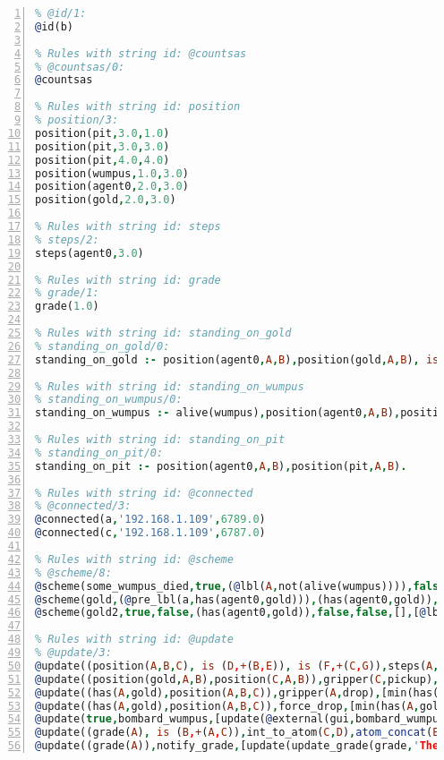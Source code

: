 \documentclass[11pt]{article}\usepackage[utf8]{inputenc}\usepackage{geometry}
\begin{document}
\lstset{breaklines=true}\begin{lstlisting}[language=Prolog, numbers=left]
% Rules with string id: @id
% @id/1:
@id(b)

% Rules with string id: @countsas
% @countsas/0:
@countsas

% Rules with string id: position
% position/3:
position(pit,3.0,1.0)
position(pit,3.0,3.0)
position(pit,4.0,4.0)
position(wumpus,1.0,3.0)
position(agent0,2.0,3.0)
position(gold,2.0,3.0)

% Rules with string id: steps
% steps/2:
steps(agent0,3.0)

% Rules with string id: grade
% grade/1:
grade(1.0)

% Rules with string id: standing_on_gold
% standing_on_gold/0:
standing_on_gold :- position(agent0,A,B),position(gold,A,B), is (C,+(A,B)),>(C,2.0).

% Rules with string id: standing_on_wumpus
% standing_on_wumpus/0:
standing_on_wumpus :- alive(wumpus),position(agent0,A,B),position(wumpus,A,B).

% Rules with string id: standing_on_pit
% standing_on_pit/0:
standing_on_pit :- position(agent0,A,B),position(pit,A,B).

% Rules with string id: @connected
% @connected/3:
@connected(a,'192.168.1.109',6789.0)
@connected(c,'192.168.1.109',6787.0)

% Rules with string id: @scheme
% @scheme/8:
@scheme(some_wumpus_died,true,(@lbl(A,not(alive(wumpus)))),false,false,false,[update(bombard_wumpus)|[]],[])
@scheme(gold,(@pre_lbl(a,has(agent0,gold))),(has(agent0,gold)),false,(@lbl(a,not(has(agent0,gold)))),false,[update(force_drop)|[]],[])
@scheme(gold2,true,false,(has(agent0,gold)),false,false,[],[@lbl(c,update(bombard_wumpus))|[]])

% Rules with string id: @update
% @update/3:
@update((position(A,B,C), is (D,+(B,E)), is (F,+(C,G)),steps(A,H), is (I,+(H,1.0))),move(A,E,G),[min(position(A,B,C)),plus(position(A,D,F)),min(steps(A,H)),plus(steps(A,I))|[]])
@update((position(gold,A,B),position(C,A,B)),gripper(C,pickup),[plus(has(C,gold)),min(position(gold,A,B))|[]])
@update((has(A,gold),position(A,B,C)),gripper(A,drop),[min(has(A,gold)),plus(position(gold,B,C))|[]])
@update((has(A,gold),position(A,B,C)),force_drop,[min(has(A,gold)),plus(position(gold,B,C)),update(@external(gui,gripper,D))|[]])
@update(true,bombard_wumpus,[update(@external(gui,bombard_wumpus,A)),min(alive(wumpus))|[]])
@update((grade(A), is (B,+(A,C)),int_to_atom(C,D),atom_concat(E,D,F)),update_grade(G,E,C),[min(grade(A)),plus(grade(B)),update(@external(gui,show_notice(G,F),H))|[]])
@update((grade(A)),notify_grade,[update(update_grade(grade,'The end result: ',A))|[]])

\end{lstlisting}
\clearpage 
\end{document}
